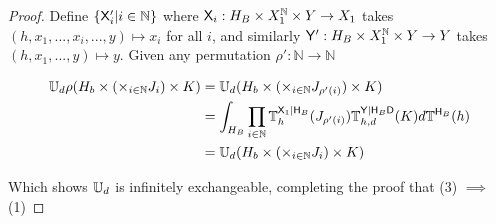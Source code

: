 \begin{proof}
Define $\{\mathsf{X}'_i|i\in \mathbb{N}\}$ where $\mathsf{X}_i:H_B\times X_1^{\mathbb{N}}\times Y\to X_1$ takes $(h,x_1,...,x_i,...,y)\mapsto x_i$ for all $i$, and similarly $\mathsf{Y}':H_B\times X_1^{\mathbb{N}}\times Y\to Y$ takes $(h, x_1,...,y)\mapsto y$. Given any permutation $\rho':\mathbb{N}\to\mathbb{N}$

\begin{align}
    \mathbb{U}_d\rho(H_b \times (\times_{i\in \mathbb{N}}J_{i})\times K)&= \mathbb{U}_d(H_b \times (\times_{i\in \mathbb{N}}J_{\rho'(i)})\times K)\\
    &= \int_{H_B} \prod_{i\in \mathbb{N}} \mathbb{T}^{\mathsf{X}_1|\mathsf{H}_B}_h(J_{\rho'(i)}) \mathbb{T}_{h,d}^{\mathsf{Y}|\mathsf{H}_B\mathsf{D}}(K)d\mathbb{T}^{\mathsf{H}_B}(h)\\
    &= \mathbb{U}_d(H_b \times (\times_{i\in \mathbb{N}}J_{i})\times K)
\end{align}

Which shows $\mathbb{U}_d$ is infinitely exchangeable, completing the proof that (3) $\implies$ (1)


\end{proof}